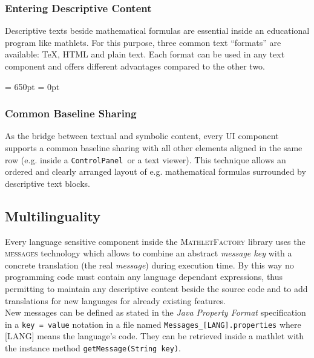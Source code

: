 \documentclass[a4paper,12pt]{article}
\newcommand{\name}[1]{\textsc{#1}}
\newcommand{\codename}[1]{\texttt{\small #1}}
\newcommand{\mf}{\name{MathletFactory }}
\newcommand{\cp}{\codename{ControlPanel }}
\begin{document}
\subsubsection*{Entering Descriptive Content}

Descriptive texts beside mathematical formulas are essential inside an educational program like mathlets.
For this purpose, three common text ``formats'' are available: TeX, HTML and plain text. Each format 
can be used in any text component and offers different advantages compared to the other two.

\textheight = 650pt
\newpage
\footskip = 0pt

\subsubsection*{Common Baseline Sharing}

As the bridge between textual and symbolic content, every UI component supports a common baseline sharing
with all other elements aligned in the same row (e.g. inside a \cp or a text viewer). This technique
allows an ordered and clearly arranged layout of e.g. mathematical formulas surrounded by descriptive
text blocks.

\subsection{Multilinguality}

Every language sensitive component inside the \mf library uses the \name{messages} technology which 
allows to combine an abstract \textit{message key} with a concrete translation (the real \textit{message})
during execution time. By this way no programming code must contain any language dependant expressions,
thus permitting to maintain any descriptive content beside the source code and to add translations for 
new languages for already existing features.\\
New messages can be defined as stated in the \textit{Java Property Format} specification in a 
\texttt{key = value} notation in a file named \texttt{Messages\_[LANG].properties} where [LANG] means 
the language's code. They can be retrieved inside a mathlet with the instance method 
\codename{getMessage(String key)}.
\end{document}
